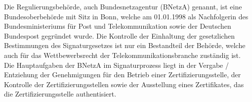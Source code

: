 Die Regulierungsbehörde, auch Bundesnetzagentur (BNetzA) genannt, ist eine Bundesoberbehörde mit Sitz in Bonn, welche am 01.01.1998 als Nachfolgerin des Bundesministeriums für Post und Telekommunikation sowie der Deutschen Bundespost gegründet wurde. Die Kontrolle der Einhaltung der gesetzlichen Bestimmungen des Signaturgesetzes ist nur ein Bestandteil der Behörde, welche auch für das Wettbewerbsrecht der Telekommunikationsbranche zuständig ist. Die Hauptaufgaben der BNetzA im Signaturprozess liegt in der Vergabe / Entziehung der Genehmigungen für den Betrieb einer Zertifizierungsstelle, der Kontrolle der Zertifizierungsstellen sowie der Ausstellung eines Zertifikates, das die Zertifizierungsstelle authentisiert. \cite{standdeswissens3}\cite{regBeh1}